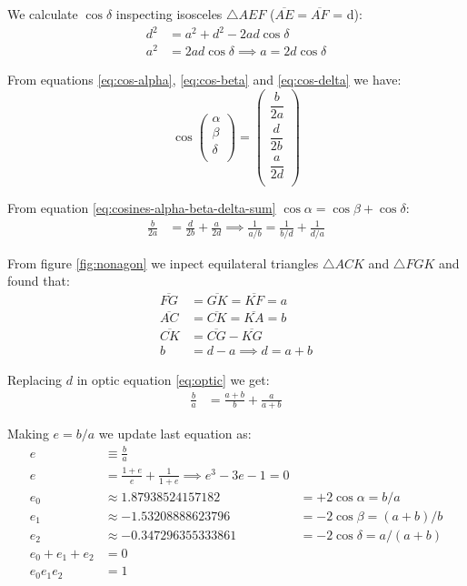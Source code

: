 \documentclass[11pt]{article}
\begin{document}
We calculate $\cos\delta$ inspecting isosceles $\triangle{AEF}$
($\overline{AE} = \overline{AF}$ = d):
\begin{align}
d^2 &= a^2 + d^2 - 2ad\cos\delta \nonumber\\
a^2 &= 2ad\cos\delta \implies \boxed{ a = 2d\cos\delta } \label{eq:cos-delta}
\end{align}

From equations \ref{eq:cos-alpha}, \ref{eq:cos-beta} and \ref{eq:cos-delta} we have:
\begin{equation}\label{eq:cos-alpha-beta-delta}
\cos\left({\begin{array}{c} \alpha\\ \beta\\ \delta\\ \end{array}}\right)
= \left({\begin{array}{c}
\dfrac{b}{2a}\\[10pt]
\dfrac{d}{2b}\\[10pt]
\dfrac{a}{2d}\\[10pt]
\end{array}}\right)
\end{equation}

From equation \ref{eq:cosines-alpha-beta-delta-sum} $\cos\alpha = \cos\beta + \cos\delta$:
\begin{align}
\frac{b}{2a} &= \frac{d}{2b} + \frac{a}{2d}
 \implies \boxed{ \frac{1}{a/b} = \frac{1}{b/d} + \frac{1}{d/a}} \label{eq:optic}
\end{align}

From figure \ref{fig:nonagon} we inpect equilateral triangles
$\triangle{ACK}$ and $\triangle{FGK}$ and found that:
\begin{align}
\overline{FG} &= \overline{GK} = \overline{KF} = a \\
\overline{AC} &= \overline{CK} = \overline{KA} = b \\
\overline{CK} &= \overline{CG} - \overline{KG} \nonumber\\
 b &= d - a \implies \boxed{ d = a + b }
\end{align}

Replacing $d$ in optic equation \ref{eq:optic} we get:
\begin{align}
\frac{b}{a} &= \frac{a+b}{b} + \frac{a}{a+b}
\end{align}

Making $e = b/a$ we update last equation as:
\begin{align}
e &\equiv \frac{b}{a} \nonumber\\
e &= \frac{1+e}{e} + \frac{1}{1+e} \implies \boxed{ e^3 - 3e - 1 = 0 } \\
e_0 &\approx 1.87938524157182   &= +2\cos\alpha = b/a \nonumber\\
e_1 &\approx -1.53208888623796  &= -2\cos\beta = (a+b)/b \nonumber\\
e_2 &\approx -0.347296355333861 &= -2\cos\delta = a/(a+b) \nonumber\\
e_0 + e_1 + e_2 &= 0 \\
e_0e_1e_2 &= 1
\end{align}
\end{document}
